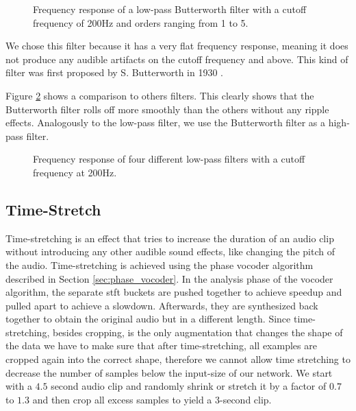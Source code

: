 \begin{figure}[H]
    \centering
     
    \caption[Butterworth-Filter with different orders]{Frequency response of a low-pass Butterworth filter with a cutoff frequency of 200Hz and orders ranging from 1 to 5.}
    \label{fig:butter_orders}
\end{figure}


We chose this filter because it has a very flat frequency response, meaning it does not produce any audible artifacts on the cutoff frequency and above. This kind of filter was first proposed by S. Butterworth in 1930 \cite{butterworth1930filter}.

Figure \ref{fig:lpCompare} shows a comparison to others filters. This clearly shows that the Butterworth filter rolls off more smoothly than the others without any ripple effects. Analogously to the low-pass filter, we use the Butterworth filter as a high-pass filter.

\begin{figure}[H]
    \centering
     
    \caption[Low-pass filter comparison]{Frequency response of four different low-pass filters with a cutoff frequency at 200Hz.}
    \label{fig:lpCompare}
\end{figure}


\subsection{Time-Stretch}

Time-stretching is an effect that tries to increase the duration of an audio clip without introducing any other audible sound effects, like changing the pitch of the audio. Time-stretching is achieved using the phase vocoder algorithm described in Section \ref{sec:phase_vocoder}. In the analysis phase of the vocoder algorithm, the separate \gls{stft} buckets are pushed together to achieve speedup and pulled apart to achieve a slowdown. Afterwards, they are synthesized back together to obtain the original audio but in a different length. Since time-stretching, besides cropping, is the only augmentation that changes the shape of the data we have to make sure that after time-stretching, all examples are cropped again into the correct shape, therefore we cannot allow time stretching to decrease the number of samples below the input-size of our network. We start with a $4.5$ second audio clip and randomly shrink or stretch it by a factor of $0.7$ to $1.3$ and then crop all excess samples to yield a 3-second clip.

